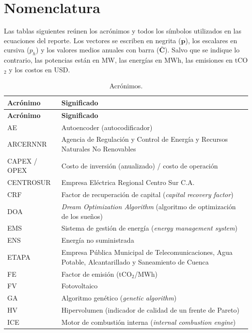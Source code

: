 \documentclass[11pt,a4paper]{article}
\newcommand{\vect}[1]{\bm{#1}}
\begin{document}
\section*{Nomenclatura}
Las tablas siguientes re\'unen los acr\'onimos y todos los s\'imbolos utilizados en las
ecuaciones del reporte. Los vectores se escriben en negrita ($\vect{p}$), los escalares en
cursiva ($p_h$) y los valores medios anuales con barra ($\bar{\vect{C}}$). Salvo que se
indique lo contrario, las potencias est\'an en MW, las energ\'ias en MWh, las emisiones
en tCO$_2$ y los costos en USD.

\begin{longtable}{L{2.6cm}L{11.6cm}}
\caption{Acr\'onimos.}\label{tab:acr}\\
\toprule
\textbf{Acr\'onimo} & \textbf{Significado} \\
\midrule
\endfirsthead
\toprule
\textbf{Acr\'onimo} & \textbf{Significado} \\
\midrule
\endhead
\bottomrule
\endfoot
AE & Autoencoder (autocodificador) \\
ARCERNNR & Agencia de Regulaci\'on y Control de Energ\'ia y Recursos Naturales No Renovables \\
CAPEX / OPEX & Costo de inversi\'on (anualizado) / costo de operaci\'on \\
CENTROSUR & Empresa El\'ectrica Regional Centro Sur C.A. \\
CRF & Factor de recuperaci\'on de capital (\emph{capital recovery factor}) \\
DOA & \emph{Dream Optimization Algorithm} (algoritmo de optimizaci\'on de los sue\~nos) \\
EMS & Sistema de gesti\'on de energ\'ia (\emph{energy management system}) \\
ENS & Energ\'ia no suministrada \\
ETAPA & Empresa P\'ublica Municipal de Telecomunicaciones, Agua Potable, Alcantarillado y Saneamiento de Cuenca \\
FE & Factor de emisi\'on (tCO$_2$/MWh) \\
FV & Fotovoltaico \\
GA & Algoritmo gen\'etico (\emph{genetic algorithm}) \\
HV & Hipervolumen (indicador de calidad de un frente de Pareto) \\
ICE & Motor de combusti\'on interna (\emph{internal combustion engine}) \\

\end{longtable}
\end{document}
